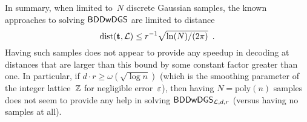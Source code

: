 In summary, when limited to~$N$ discrete Gaussian samples, the known
approaches to solving $\mathsf{BDDwDGS}$ are limited to distance
\begin{equation}
  \label{eq:dist-given-samples}
  \operatorname{dist}(\mathbf{t}, \mathcal{L}) \leq r^{-1} \sqrt{\ln(N)/(2\pi)} \enspace .
\end{equation}
Having such samples does not appear to provide any speedup in
decoding at distances that are larger than this bound by some constant factor
greater than one.  In particular, if
$d \cdot r \geq \omega(\sqrt{\log n})$ (which is the smoothing
parameter of the integer lattice~$\mathbb{Z}$ for negligible error~$\varepsilon$),
then having $N=\text{poly}(n)$ samples does not seem to provide any
help in solving $\mathsf{BDDwDGS}_{\mathcal{L},d,r}$ (versus having no samples at
all).





